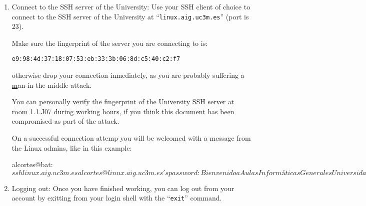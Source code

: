 \documentclass[a4paper, 12pt]{article}
\begin{document}
\begin{enumerate}
\begin{enumerate}
      If you are using Linux or Mac, there is a great chance you
      already have an SSH client installed in your computer, the program is
      called ``\texttt{ssh}''. If this program is not already installed, just
      install it.

    \item Connect to the SSH server of the University: Use your SSH client of
      choice to connect to the SSH server of the University at
      ``\texttt{linux.aig.uc3m.es}'' (port is 23).

      Make sure the fingerprint of the server you are connecting to is:

      \begin{center}
        \texttt{e9:98:4d:37:18:07:53:eb:33:3b:06:8d:c5:40:c2:f7}
      \end{center}

      otherwise drop your connection inmediately, as you are probably suffering
      a
      \href{http://en.wikipedia.org/wiki/Man-in-the-middle_attackman-in-the-middle}
      man-in-the-middle attack.

      You can personally verify the fingerprint of the University SSH server at
      room 1.1.J07 during working hours, if you think this document has been
      compromised as part of the attack.

      On a successful connection attemp you will be
      welcomed with a message from the Linux admins, like in this example:

\begin{blackboard}
alcortes@bat:~$ ssh linux.aig.uc3m.es
alcortes@linux.aig.uc3m.es's password: 

       Bienvenido a Aulas Informáticas Generales
          Universidad Carlos III de Madrid

          Puede contactar con nosotros en:
     
                gsai@aig.uc3m.es

Last login: Tue Jan 13 13:53:33 2015 from bat.it.uc3m.es
alcortes@linux:~$
\end{blackboard}

    \item Logging out: Once you have finished working, you can log out from
      your account by exitting from your login shell with the ``\texttt{exit}''
      command.

  \end{enumerate}

\end{enumerate}
\end{document}
